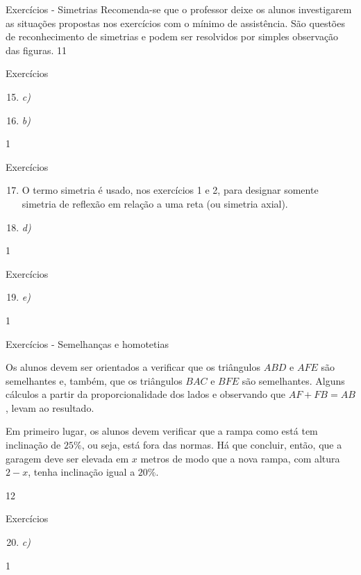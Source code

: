 \begin{sugestions}{Exercícios - Simetrias}
{
Recomenda-se que o professor deixe os alunos investigarem as situações propostas nos exercícios com o mínimo de assistência. São questões de reconhecimento de simetrias e podem ser resolvidos por simples observação das figuras.   
}{1}{1}
\end{sugestions}
\clearmargin
\begin{answer}{Exercícios}
{\exerciselist
\begin{enumerate}\setcounter{enumi}{14}
\item \textit{c)}

\item \textit{b)}
\end{enumerate}
}{1}
\end{answer}
\clearmargin
\begin{answer}{Exercícios}
{\exerciselist
\begin{enumerate}\setcounter{enumi}{16}
\item O termo simetria é usado, nos exercícios 1 e 2, para designar somente simetria de reflexão em relação a uma reta (ou simetria axial). 

\item \textit{d)}
\end{enumerate}
}{1}
\end{answer}
\clearmargin
\begin{answer}{Exercícios}
{\exerciselist
\begin{enumerate}\setcounter{enumi}{18}
\item \textit{e)}
\end{enumerate}
}{1}
\end{answer}
\begin{sugestions}{Exercícios - Semelhanças e homotetias}
{

Os alunos devem ser orientados a verificar que os triângulos $ABD$ e $AFE$ são semelhantes e, também, que os triângulos $BAC$ e $BFE$ são semelhantes. Alguns cálculos a partir da proporcionalidade dos lados e observando que $AF + FB = AB$, levam ao resultado.

Em primeiro lugar, os alunos devem verificar que a rampa como está tem inclinação de $25\%$, ou seja, está fora das normas. Há que concluir, então, que a garagem deve ser elevada em $x$ metros de modo que a nova rampa, com altura$ 2-x$, tenha inclinação igual a $20\%$.
}{1}{2}
\end{sugestions}
\begin{answer}{Exercícios}
{\exerciselist
\begin{enumerate}\setcounter{enumi}{19}
\item \textit{c)}
\end{enumerate}
}{1}
\end{answer}
